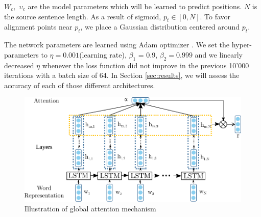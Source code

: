 $W_c,$  $\upsilon_c$ are the model parameters which will be learned to predict positions. $N$ is the source sentence length. As a result of sigmoid, $p_t \in [0, N]$. To favor alignment points near $p_t$, we place a Gaussian distribution centered around $p_t$. 

The network parameters are learned using Adam optimizer \cite{kingma2014adam}. We set the hyper-parameters to $\eta = 0.001$(learning rate), $\beta_1$ = 0.9, $\beta_2=0.999$ and we linearly decreased $\eta$ whenever the loss function did not improve in the previous 10'000 iterations with a batch size of 64. In Section \ref{sec:results}, we will assess the accuracy of each of those different architectures.

\begin{figure} 	
	\centering 	
	\includegraphics[width=\columnwidth]{graphics/attention-mechanism.pdf} 	
	\caption{Illustration of global attention mechanism} 	
	\label{fig:attention-mechanism} 
\end{figure}
